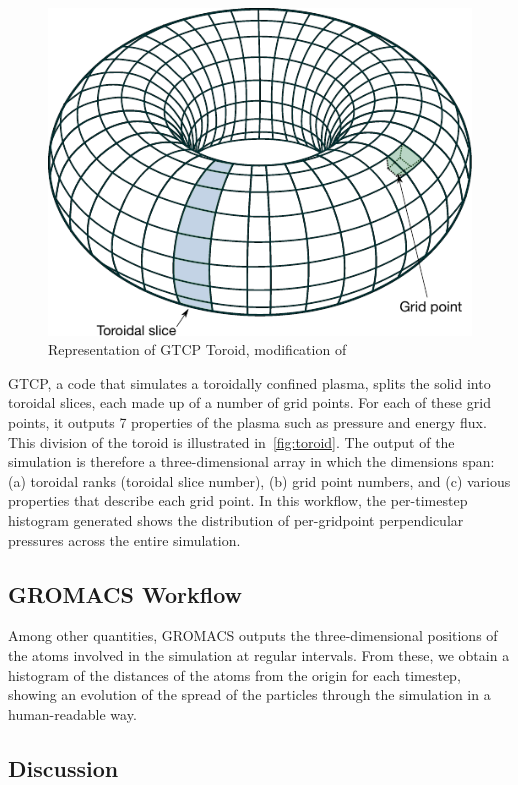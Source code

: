 \begin{figure}
  \centering
  \vspace{-0.10in}
  \includegraphics[width=0.7\columnwidth]{fig/Simple_Torus_mod}
  \vspace{-0.09in}
  \caption{Representation of GTCP Toroid, modification of \cite{WikimediaCommons:torus}}
  \label{fig:toroid}
  \vspace{-0.20in}
\end{figure}

GTCP, a code that simulates a toroidally confined plasma, splits the solid into
toroidal slices, each made up of a number of grid points. For each of these
grid points, it outputs 7 properties of the plasma such as pressure and energy
flux. This division of the toroid is illustrated in~\autoref{fig:toroid}.
The output of the simulation is therefore a three-dimensional array in which
the dimensions span: (a) toroidal ranks (toroidal slice number), (b) grid point
numbers, and (c) various properties that describe each grid point.
In this workflow, the per-timestep histogram
generated shows the distribution of per-gridpoint perpendicular pressures across
the entire simulation.

\subsection{GROMACS Workflow}

Among other quantities, GROMACS outputs
the three-dimensional positions
of the atoms involved in the simulation
at regular intervals.
From these, we obtain a histogram of the distances
of the atoms from the origin for each timestep, showing
an evolution of the spread of the particles through
the simulation in a human-readable way.

\subsection{Discussion}

